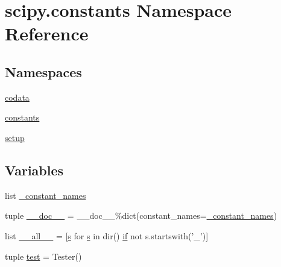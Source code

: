 \hypertarget{namespacescipy_1_1constants}{}\section{scipy.\+constants Namespace Reference}
\label{namespacescipy_1_1constants}
\subsection*{Namespaces}
\begin{DoxyCompactItemize}
\item 
 \hyperlink{namespacescipy_1_1constants_1_1codata}{codata}
\item 
 \hyperlink{namespacescipy_1_1constants_1_1constants}{constants}
\item 
 \hyperlink{namespacescipy_1_1constants_1_1setup}{setup}
\end{DoxyCompactItemize}
\subsection*{Variables}
\begin{DoxyCompactItemize}
\item 
list \hyperlink{namespacescipy_1_1constants_a391f23b56d1f395ddc55cdf4745095ff}{\+\_\+constant\+\_\+names}
\item 
tuple \hyperlink{namespacescipy_1_1constants_a083edbab749523d0373c761fed026093}{\+\_\+\+\_\+doc\+\_\+\+\_\+} = \+\_\+\+\_\+doc\+\_\+\+\_\+\%dict(constant\+\_\+names=\hyperlink{namespacescipy_1_1constants_a391f23b56d1f395ddc55cdf4745095ff}{\+\_\+constant\+\_\+names})
\item 
list \hyperlink{namespacescipy_1_1constants_aab236098483b3e189f4aada95bd3084f}{\+\_\+\+\_\+all\+\_\+\+\_\+} = \mbox{[}\hyperlink{indexexpr_8h_ae024b0db549122b44c349ae28ec990dc}{s} for \hyperlink{indexexpr_8h_ae024b0db549122b44c349ae28ec990dc}{s} in dir() \hyperlink{minmax_8h_a30a0ee9fee303f01d9c5e6f669e0dfe9}{if} not s.\+startswith('\+\_\+')\mbox{]}
\item 
tuple \hyperlink{namespacescipy_1_1constants_aa90d5edfe1580bda302530bfb9b60081}{test} = Tester()
\end{DoxyCompactItemize}


